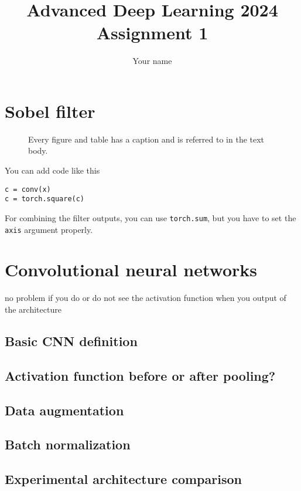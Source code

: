 \documentclass[12pt,a4paper]{article}
\begin{document}
\title{Advanced Deep Learning 2024\\Assignment 1}
\author{\color{red}Your name}
\maketitle

\section{Sobel filter}
\begin{figure}
  \begin{center}
  \end{center}
  \caption{Every figure and table has a caption and is referred to 
    in the text body.\label{fig:q6p1}}
\end{figure}



You can add code like this
\begin{lstlisting}
c = conv(x)
c = torch.square(c)
\end{lstlisting}

For combining the filter outputs, you can  use 
\lstinline{torch.sum}, but you have to set the \lstinline{axis}
argument properly.

\section{Convolutional neural networks}

no problem if you do or do not see the activation function when you output of the architecture 


\subsection{Basic CNN definition}
\subsection{Activation function before or after pooling?}
\subsection{Data augmentation}
\subsection{Batch normalization}
\subsection{Experimental architecture comparison}
\end{document}
